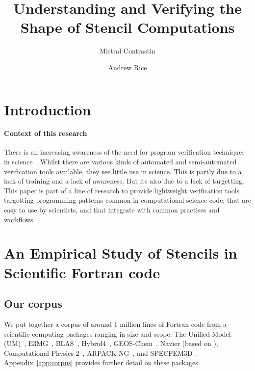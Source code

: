 \documentclass[acmlarge,review,anonymous]{acmart}\settopmatter{printfolios=true}
\begin{document}
\title{Understanding and Verifying the Shape of Stencil Computations}

\author{Mistral Contrastin}

\author{Andrew Rice}

\maketitle

\section{Introduction}

\paragraph{Context of this research}

There is an increasing awareness of the need for program verification
techniques in
science~\cite{post2005computational,oberkampf2010verification,orchard2014computational}.
Whilst there are various kinds of automated and semi-automated
verification tools available, they see little use in science. This is
partly due to a lack of training and a lack of awareness. But its also
due to a lack of targetting. This paper is part of a line of research
to provide lightweight verification tools targetting
programming patterns common in computational science code, 
that are easy to use by scientists, and that integrate with common
practises and workflows.




\section{An Empirical Study of Stencils in Scientific Fortran code}

\subsection{Our corpus}
%
\noindent
We put together a corpus of around 1 million lines of Fortran code from a
\numPackages{} scientific computing packages ranging in size and scope: The Unified Model (UM)~\cite{um},
E3MG~\cite{RePEc:aen:journl:2006se-a12}, BLAS~\cite{blas},
Hybrid4~\cite{GBC:GBC635}, GEOS-Chem~\cite{geos-chem}, Navier (based
on \cite{griebel1997numerical}), Computational Physics
2~\cite{nicholas2006computational},
ARPACK-NG~\cite{arpackng}, and
SPECFEM3D~\cite{specfem3d}. Appendix~\ref{app:corpus} provides
further detail on these packages.
\end{document}
